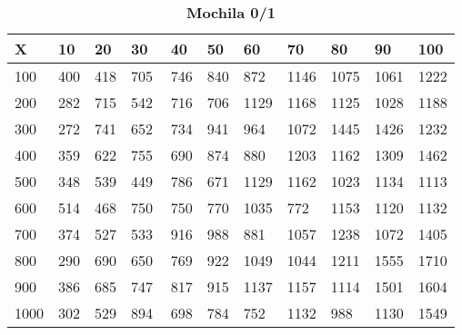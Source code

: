 \documentclass[10pt,letterpaper]{article}
\begin{document}
\newpage 
{}
\begin{center}
\begin{table}\renewcommand{\arraystretch}{2.5}
\caption{\large \textbf{Mochila 0/1}}
\centering
\begin{tabular} { |m{0.5cm}|m{1.3cm}|m{1.3cm}|m{1.3cm}|m{1.3cm}|m{1.3cm}|m{1.3cm}|m{1.3cm}|m{1.3cm}|m{1.3cm}|m{1.3cm}|} 
\hline
\rowcolor{Gray}
\centering \textbf{X} & \centering \textbf{10} & \centering \textbf{20} & \centering \textbf{30}\ & \centering \textbf{40} & \centering \textbf{50} & \centering \textbf{60}\ & \centering \textbf{70} & \centering \textbf{80} & \centering \textbf{90}\ & \textbf{100} \\\hline
\cellcolor{Gray}100 & \Large 400 & \Large 418 & \Large 705 & \Large 746 & \Large 840 & \Large 872 & \Large 1146 & \Large 1075 & \Large 1061 & \Large 1222 \\
\hline
\cellcolor{Gray}200 & \Large 282 & \Large 715 & \Large 542 & \Large 716 & \Large 706 & \Large 1129 & \Large 1168 & \Large 1125 & \Large 1028 & \Large 1188 \\
\hline
\cellcolor{Gray}300 & \Large 272 & \Large 741 & \Large 652 & \Large 734 & \Large 941 & \Large 964 & \Large 1072 & \Large 1445 & \Large 1426 & \Large 1232 \\
\hline
\cellcolor{Gray}400 & \Large 359 & \Large 622 & \Large 755 & \Large 690 & \Large 874 & \Large 880 & \Large 1203 & \Large 1162 & \Large 1309 & \Large 1462 \\
\hline
\cellcolor{Gray}500 & \Large 348 & \Large 539 & \Large 449 & \Large 786 & \Large 671 & \Large 1129 & \Large 1162 & \Large 1023 & \Large 1134 & \Large 1113 \\
\hline
\cellcolor{Gray}600 & \Large 514 & \Large 468 & \Large 750 & \Large 750 & \Large 770 & \Large 1035 & \Large 772 & \Large 1153 & \Large 1120 & \Large 1132 \\
\hline
\cellcolor{Gray}700 & \Large 374 & \Large 527 & \Large 533 & \Large 916 & \Large 988 & \Large 881 & \Large 1057 & \Large 1238 & \Large 1072 & \Large 1405 \\
\hline
\cellcolor{Gray}800 & \Large 290 & \Large 690 & \Large 650 & \Large 769 & \Large 922 & \Large 1049 & \Large 1044 & \Large 1211 & \Large 1555 & \Large 1710 \\
\hline
\cellcolor{Gray}900 & \Large 386 & \Large 685 & \Large 747 & \Large 817 & \Large 915 & \Large 1137 & \Large 1157 & \Large 1114 & \Large 1501 & \Large 1604 \\
\hline
\cellcolor{Gray}1000 & \Large 302 & \Large 529 & \Large 894 & \Large 698 & \Large 784 & \Large 752 & \Large 1132 & \Large 988 & \Large 1130 & \Large 1549 \\
\hline
\end{tabular} \\
\end{table}
\end{center}
\end{document}
